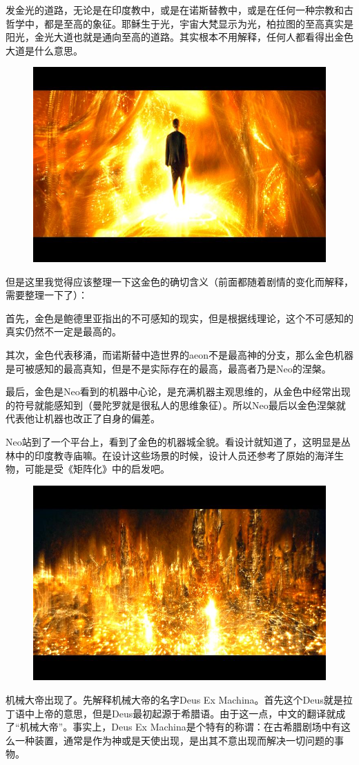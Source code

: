 \documentclass[UTF8]{ctexart}
\begin{document}
发金光的道路，无论是在印度教中，或是在诺斯替教中，或是在任何一种宗教和古哲学中，都是至高的象征。耶稣生于光，宇宙大梵显示为光，柏拉图的至高真实是阳光，金光大道也就是通向至高的道路。其实根本不用解释，任何人都看得出金色大道是什么意思。

\begin{figure}[htb]
\centering
\includegraphics[width=0.5\linewidth]{fig/3c153812db6aa550f819b8b1.jpg}
\end{figure}

但是这里我觉得应该整理一下这金色的确切含义（前面都随着剧情的变化而解释，需要整理一下了）：

首先，金色是鲍德里亚指出的不可感知的现实，但是根据线理论，这个不可感知的真实仍然不一定是最高的。

其次，金色代表移涌，而诺斯替中造世界的aeon不是最高神的分支，那么金色机器是可被感知的最高真知，但是不是实际存在的最高，最高者乃是Neo的涅槃。

最后，金色是Neo看到的机器中心论，是充满机器主观思维的，从金色中经常出现的符号就能感知到（曼陀罗就是很私人的思维象征）。所以Neo最后以金色涅槃就代表他让机器也改正了自身的偏差。

Neo站到了一个平台上，看到了金色的机器城全貌。看设计就知道了，这明显是丛林中的印度教寺庙嘛。在设计这些场景的时候，设计人员还参考了原始的海洋生物，可能是受《矩阵化》中的启发吧。

\begin{figure}[htb]
\centering
\includegraphics[width=0.5\linewidth]{fig/ac70b21bd920ed188618bfb1.jpg}
\end{figure}

机械大帝出现了。先解释机械大帝的名字Deus Ex Machina。首先这个Deus就是拉丁语中上帝的意思，但是Deus最初起源于希腊语。由于这一点，中文的翻译就成了“机械大帝”。事实上，Deus Ex Machina是个特有的称谓：在古希腊剧场中有这么一种装置，通常是作为神或是天使出现，是出其不意出现而解决一切问题的事物。
\end{document}
